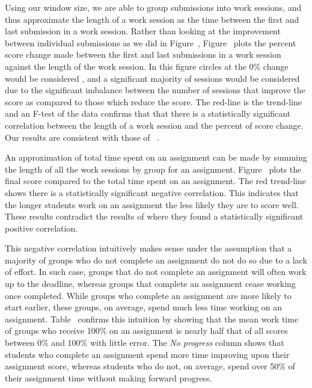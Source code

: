 Using our window size, we are able to group submissions into work sessions, and
thus approximate the length of a work session as the time between the first and
last submission in a work session. Rather than looking at the improvement
between individual submissions as we did in
Figure~, Figure~
plots the percent score change made between the first and last submissions in a
work session against the length of the work session. In this figure circles at
the 0\% change would be considered \noi{}, and a significant majority of
sessions would be considered \imp{} due to the significant imbalance between
the number of sessions that improve the score as compared to those which reduce
the score. The red-line is the trend-line and an F-test of the data confirms
that that there is a statistically significant correlation between the length
of a work session and the percent of score change. Our results are consistent
with those of \spacco{}~\cite{Spacco:2013:TIP:2462476.2465594}.

An approximation of total time spent on an assignment can be made by summing
the length of all the work sessions by group for an
assignment. Figure~ plots the final score compared to
the total time spent on an assignment. The red trend-line shows there is a
statistically significant negative correlation. This indicates that the longer
students work on an assignment the less likely they are to score well. These
results contradict the results of \spacco{} where they found a statistically
significant positive correlation.

This negative correlation intuitively makes sense under the assumption that a
majority of groups who do not complete an assignment do not do so due to a lack
of effort. In such case, groups that do not complete an assignment will often
work up to the deadline, whereas groups that complete an assignment cease
working once completed. While groups who complete an assignment are more likely
to start earlier, these groups, on average, spend much less time working on an
assignment. Table~ confirms this intuition by showing
that the mean work time of groups who receive 100\% on an assignment is nearly
half that of all scores between 0\% and 100\% with little error. The \emph{No
  progress} column shows that students who complete an assignment spend more
time improving upon their assignment score, whereas students who do not, on
average, spend over 50\% of their assignment time without making forward
progress.

